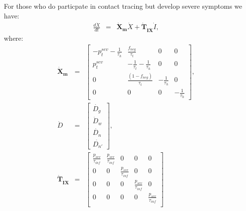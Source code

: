 \documentclass[notitlepage, superscriptaddress]{revtex4-2}
\begin{document}
For those who do particpate in contact tracing but develop severe symptoms we have:
\begin{eqnarray}
\frac{d\dot{X}}{dt} &=& \boldsymbol{\dot{X}_{m}}  \dot{X} + \boldsymbol{\dot{T}_{\dot{I}\dot{X}}}  \dot{I}, 
\end{eqnarray}
where:
%
\begin{eqnarray}
\boldsymbol{\dot{X}_{m}} &=&
\begin{bmatrix}
- p^{sev}_{t}   - \frac{1}{\tau_{h}}      &  \frac{f_{neg}}{\tau_{t}}    & 0  & 0\\
p^{sev}_{t}                  &  -\frac{1}{\tau_{t}}  - \frac{1}{\tau_{h}}  & 0 & 0\\
0 & \frac{(1-f_{neg})}{\tau_{t}}  &  -  \frac{1}{\tau_{h}} & 0 \\ 
0 & 0 & 0 &  -  \frac{1}{\tau_{h}}
\end{bmatrix}, \\ 
%
\dot{D} &=& 
\begin{bmatrix}
\dot{D_{g}} \\  \dot{D}_{w}\\ \dot{D_{n}} \\ \dot{D_{n'}}
\end{bmatrix}, \\ 
%
\boldsymbol{\dot{T}_{\dot{I}\dot{X}}} &=&
\begin{bmatrix}
\frac{p_{sev}}{\tau_{inf}}  &  \frac{p_{sev}}{\tau_{inf}}                 & 0 & 0 & 0 \\ 
 0          & 0                 &  \frac{p_{sev}}{\tau_{inf}} & 0 & 0 \\ 
0           & 0                 &  0 & \frac{p_{sev}}{\tau_{inf}} & 0 \\ 
0           & 0                 &  0 & 0 & \frac{p_{sev}}{\tau_{inf}} \\
\end{bmatrix}
\end{eqnarray}





  
\end{document}

